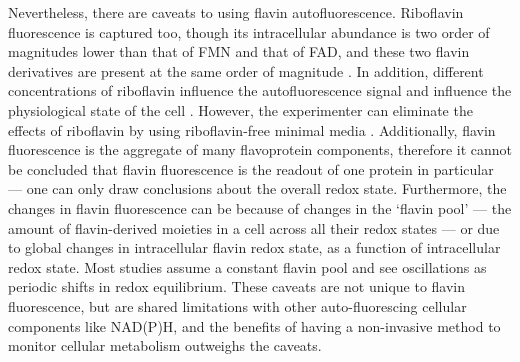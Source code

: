 Nevertheless, there are caveats to using flavin autofluorescence.
Riboflavin fluorescence is captured too, though its intracellular abundance is two order of magnitudes lower than that of FMN and that of FAD, and these two flavin derivatives are present at the same order of magnitude \parencite{tuCyclicChangesMetabolic2007}.
In addition, different concentrations of riboflavin influence the autofluorescence signal and influence the physiological state of the cell \parencite{maslankaAutofluorescenceYeastSaccharomyces2018}.
However, the experimenter can eliminate the effects of riboflavin by using riboflavin-free minimal media \parencite{verduynEffectBenzoicAcid1992}.
Additionally, flavin fluorescence is the aggregate of many flavoprotein components, therefore it cannot be concluded that flavin fluorescence is the readout of one protein in particular --- one can only draw conclusions about the overall redox state.
Furthermore, the changes in flavin fluorescence can be because of changes in the `flavin pool' --- the amount of flavin-derived moieties in a cell across all their redox states --- or due to global changes in intracellular flavin redox state, as a function of intracellular redox state.
Most studies assume a constant flavin pool and see oscillations as periodic shifts in redox equilibrium.
These caveats are not unique to flavin fluorescence, but are shared limitations with other auto-fluorescing cellular components like NAD(P)H, and the benefits of having a non-invasive method to monitor cellular metabolism outweighs the caveats.

